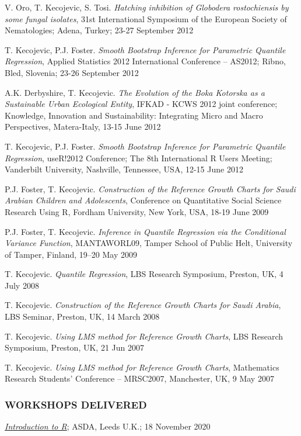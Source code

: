 \documentclass[
]{article}
\begin{document}
V. Oro, T. Kecojevic, S. Tosi. \emph{Hatching inhibition of Globodera
rostochiensis by some fungal isolates}, 31st International Symposium of
the European Society of Nematologies; Adena, Turkey; 23-27 September
2012

T. Kecojevic, P.J. Foster. \emph{Smooth Bootstrap Inference for
Parametric Quantile Regression}, Applied Statistics 2012 International
Conference -- AS2012; Ribno, Bled, Slovenia; 23-26 September 2012

A.K. Derbyshire, T. Kecojevic. \emph{The Evolution of the Boka Kotorska
as a Sustainable Urban Ecological Entity}, IFKAD - KCWS 2012 joint
conference; Knowledge, Innovation and Sustainability: Integrating Micro
and Macro Perspectives, Matera-Italy, 13-15 June 2012

T. Kecojevic, P.J. Foster. \emph{Smooth Bootstrap Inference for
Parametric Quantile Regression}, useR!2012 Conference; The 8th
International R Users Meeting; Vanderbilt University, Nashville,
Tennessee, USA, 12-15 June 2012

P.J. Foster, T. Kecojevic. \emph{Construction of the Reference Growth
Charts for Saudi Arabian Children and Adolescents}, Conference on
Quantitative Social Science Research Using R, Fordham University, New
York, USA, 18-19 June 2009

P.J. Foster, T. Kecojevic. \emph{Inference in Quantile Regression via
the Conditional Variance Function}, MANTAWORL09, Tamper School of Public
Helt, University of Tamper, Finland, 19--20 May 2009

T. Kecojevic. \emph{Quantile Regression}, LBS Research Symposium,
Preston, UK, 4 July 2008

T. Kecojevic. \emph{Construction of the Reference Growth Charts for
Saudi Arabia}, LBS Seminar, Preston, UK, 14 March 2008

T. Kecojevic. \emph{Using LMS method for Reference Growth Charts}, LBS
Research Symposium, Preston, UK, 21 Jun 2007

T. Kecojevic. \emph{Using LMS method for Reference Growth Charts},
Mathematics Research Students' Conference -- MRSC2007, Manchester, UK, 9
May 2007

\hypertarget{workshops-delivered}{%
\subsubsection{WORKSHOPS DELIVERED}\label{workshops-delivered}}

\emph{\href{https://introtor.netlify.app}{Introduction to R}}; ASDA,
Leeds U.K.; 18 November 2020
\end{document}

